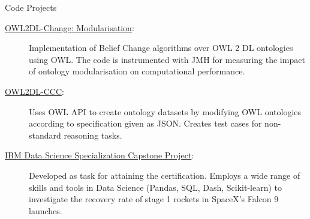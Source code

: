 %

\begin{rSection}{Code Projects}
    \begin{description}
        \item[\href{https://gitlab.com/rfguimaraes/owl-change}{OWL2DL-Change: Modularisation}:] Implementation of Belief Change algorithms over OWL 2 DL ontologies using OWL. The code is instrumented with JMH for measuring the impact of ontology modularisation on computational performance.
        \item[\href{https://gitlab.com/rfguimaraes/owl2dl-ccc}{OWL2DL-CCC}:] Uses OWL API to create ontology datasets by modifying OWL ontologies according to specification given as JSON. Creates test cases for non-standard reasoning tasks.
        \item[\href{https://github.com/rfguimaraes/DataScienceCapstone}{IBM Data Science Specialization Capstone Project}:] Developed as task for attaining the certification. Employs a wide range of skills and tools in Data Science (Pandas, SQL, Dash, Scikit-learn) to investigate the recovery rate of stage 1 rockets in SpaceX's Falcon 9 launches.
    \end{description}
\end{rSection}

